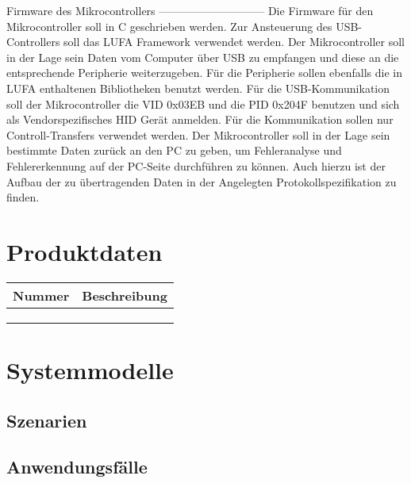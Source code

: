 \documentclass[a4paper,12pt]{article}
\newcommand\addrow[2]{#1 &#2\\ }
\newcommand\addheading[2]{#1 &#2\\ \hline}
\newcommand\tabularhead{\begin{tabular}{lp{13cm}}
\hline
}
\newenvironment{usecase}{\tabularhead}
{\hline\end{tabular}}
\begin{document}
Firmware des Mikrocontrollers
-----------------------------
Die Firmware für den Mikrocontroller soll in C geschrieben werden. 
Zur Ansteuerung des USB-Controllers soll das LUFA Framework verwendet werden.
Der Mikrocontroller soll in der Lage sein Daten vom Computer über USB zu empfangen und diese
an die entsprechende Peripherie weiterzugeben. Für die Peripherie sollen ebenfalls die in LUFA enthaltenen Bibliotheken
benutzt werden.
Für die USB-Kommunikation soll der Mikrocontroller die VID 0x03EB und die PID 0x204F benutzen und sich als Vendorspezifisches HID Gerät anmelden. Für die Kommunikation sollen nur Controll-Transfers verwendet werden. Der Mikrocontroller soll in der Lage sein bestimmte Daten zurück an den PC zu geben, um Fehleranalyse und Fehlererkennung auf der PC-Seite durchführen zu können.
Auch hierzu ist der Aufbau der zu übertragenden Daten in der Angelegten Protokollspezifikation zu finden.


\section{Produktdaten}
\begin{usecase}
  \addheading{Nummer}{Beschreibung} 
  \addrow{}{}
  \addrow{}{}
  \addrow{}{}
\end{usecase}

\section{Systemmodelle}
\subsection{Szenarien}
\subsection{Anwendungsfälle}

\clearpage
 
\end{document}

